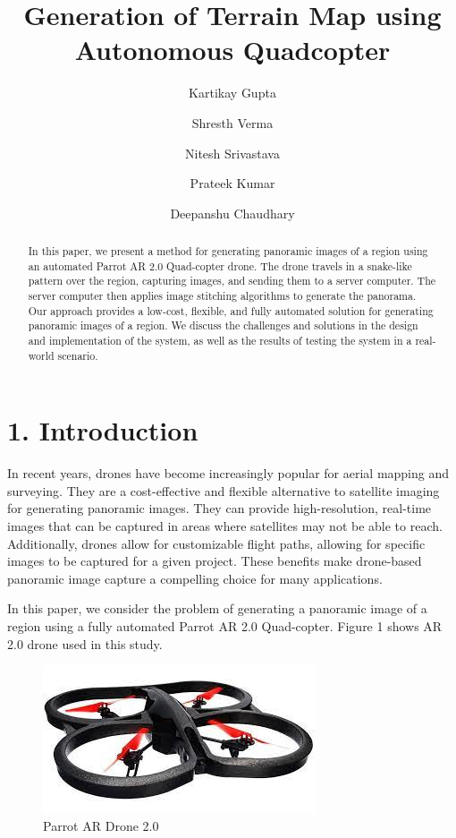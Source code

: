 \documentclass[
  journal=largetwo,
  manuscript=article-type,
  year=2023,
  volume=1,
]{iitp-journal}
\title{Generation of Terrain Map using Autonomous Quadcopter}
\author{Kartikay Gupta}
\author{Shresth Verma}
\author{Nitesh Srivastava}
\author{Prateek Kumar}
\author{Deepanshu Chaudhary}
\begin{document}
\begin{abstract}
In this paper, we present a method for generating panoramic images of a region using an automated Parrot AR 2.0 Quad-copter drone. The drone travels in a snake-like pattern over the region, capturing images, and sending them to a server computer. The server computer then applies image stitching algorithms to generate the panorama. Our approach provides a low-cost, flexible, and fully automated solution for generating panoramic images of a region. We discuss the challenges and solutions in the design and implementation of the system, as well as the results of testing the system in a real-world scenario.
\end{abstract}


\section{1. Introduction}
In recent years, drones have become increasingly popular for aerial mapping and surveying. They are a cost-effective and flexible alternative to satellite imaging for generating panoramic images. They can provide high-resolution, real-time images that can be captured in areas where satellites may not be able to reach. Additionally, drones allow for customizable flight paths, allowing for specific images to be captured for a given project. These benefits make drone-based panoramic image capture a compelling choice for many applications.

In this paper, we consider the problem of generating a panoramic image of a region using a fully automated Parrot AR 2.0 Quad-copter. Figure 1 shows AR 2.0 drone used in this study. 

\begin{figure}[hbt!]
\centering
\includegraphics[width=0.75\linewidth]{AR-2.0-quadcopter.jpeg}
\caption{Parrot AR Drone 2.0}
\label{fig_sim}
\end{figure}
\end{document}

